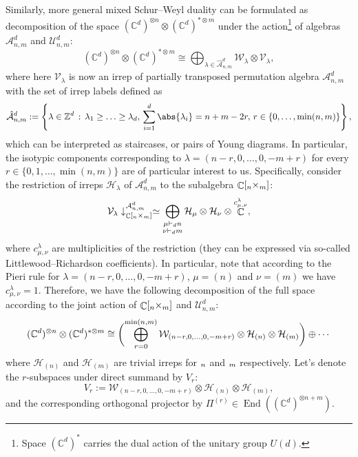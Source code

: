 \documentclass[aps,twocolumn,pra,superscriptaddress,nofootinbib]{revtex4-2}
\DeclarePairedDelimiter{\of}{\lparen}{\rparen}
\newcommand{\set}[1]{\left\{#1\right\}}
\newcommand{\mA}{\mathcal{A}}
\newcommand{\mU}{\mathcal{U}}
\let\S\relax
\DeclareMathOperator{\S}{S} %
\DeclareMathOperator{\C}{\mathbb{C}} %
\DeclareMathOperator{\End}{End}
\begin{document}
Similarly, more general mixed Schur--Weyl duality can be formulated as decomposition of the space $(\mathbb{C}^d)^{\otimes n} \otimes (\mathbb{C}^d)^{* \otimes m}$ under the action\footnote{Space $(\mathbb{C}^d)^{*}$ carries the dual action of the unitary group $U(d)$.} of algebras $\mA_{n,m}^d$ and $\mU_{n,m}^d$:
\begin{equation}
    (\mathbb{C}^d)^{\otimes n} \otimes (\mathbb{C}^d)^{* \otimes m} \cong \bigoplus_{\lambda \in \hat{\mA}_{n,m}^d} \mathcal{W}_\lambda \otimes \mathcal{V}_\lambda,
\end{equation}
where here $\mathcal{V}_\lambda$ is now an irrep of partially transposed permutation algebra $\mA_{n,m}^d$ with the set of irrep labels defined as
\begin{equation}
    \hat{\mA}_{n,m}^d := \set{ \lambda \in \mathbb{Z}^d  \, : \, \lambda_1 \geq \dotsc \geq \lambda_d, \, \sum_{i=1}^d \abs{\lambda_i} = n+m-2r, \, r \in \set{0,\dotsc,\min(n,m)}},
\end{equation}
which can be interpreted as staircases, or pairs of Young diagrams. In particular, the isotypic components corresponding to $\lambda = (n-r,0,\dotsc,0,-m+r)$ for every $r \in \{0,1,\dotsc,\min(n,m) \}$ are of particular interest to us. Specifically, consider the restriction of irreps $\mathcal{H}_\lambda$ of $\mA_{n,m}^d$ to the subalgebra $\C[\S_n \times \S_m]$:
\begin{equation}
    \mathcal{V}_\lambda \downarrow^{\mA_{n,m}^d}_{\C[\S_n \times \S_m]} \simeq \bigoplus_{\substack{\mu \vdash_d n \\ \nu \vdash_d m}} \mathcal{H}_\mu \otimes \mathcal{H}_\nu \otimes \C^{c^{\lambda}_{\mu,\nu}},
\end{equation}
where $c^{\lambda}_{\mu,\nu}$ are multiplicities of the restriction (they can be expressed via so-called Littlewood--Richardson coefficients).
In particular, note that according to the Pieri rule for $\lambda = (n-r,0,\dotsc,0,-m+r)$, $\mu = (n)$ and $\nu = (m)$ we have $c^{\lambda}_{\mu,\nu} = 1$. Therefore, we have the following decomposition of the full space according to the joint action of $\C[\S_n \times \S_m]$ and $\mU_{n,m}^d$:
\begin{equation}
    (\mathbb{C}^d)^{\otimes n} \otimes (\mathbb{C}^d)^{* \otimes m} \cong \of[\bigg]{\bigoplus_{r=0}^{\min(n,m)} \mathcal{W}_{(n-r,0,\dotsc,0,-m+r)} \otimes \mathcal{H}_{(n)} \otimes \mathcal{H}_{(m)}} \oplus \dotsb
\end{equation}
where $\mathcal{H}_{(n)}$ and $\mathcal{H}_{(m)}$ are trivial irreps for $\S_n$ and $\S_m$ respectively.
Let's denote the $r$-subspaces under direct summand by $V_r$:
\begin{equation}
\label{eq:V_r_def}
    V_r := \mathcal{W}_{(n-r,0,\dotsc,0,-m+r)} \otimes \mathcal{H}_{(n)} \otimes \mathcal{H}_{(m)},
\end{equation}
and the corresponding orthogonal projector by $\Pi^{(r)} \in \End((\mathbb{C}^d)^{\otimes n+m})$.
\end{document}
